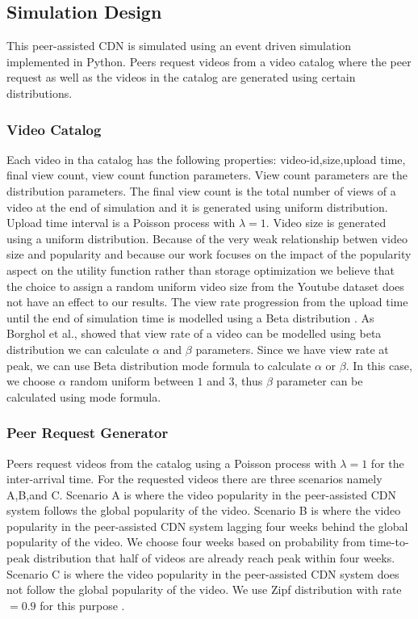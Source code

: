 \subsection{Simulation Design}\label{simulationdesign}
This peer-assisted CDN is simulated using an event driven simulation implemented in Python. 
Peers request videos from a video catalog where the peer request as well as the videos in the catalog are generated using certain distributions.

\subsubsection{Video Catalog}\label{catalog}
Each video in tha catalog has the following properties: 
video-id,size,upload time, final view count, view count function parameters. 
View count parameters are the distribution parameters.
The final view count is the total number of views of a video at the end of simulation and it is generated using uniform distribution.
Upload time interval is a Poisson process with $\lambda=1$.
Video size is generated using a uniform distribution.
Because of the very weak relationship betwen video size and popularity \cite{abhari2010workload} and because our work focuses on the impact of the popularity aspect on the utility function rather than storage optimization we believe that the choice to assign a random uniform video size from the Youtube dataset does not have an effect to our results. 
The view rate progression from the upload time until the end of simulation time is modelled using a Beta distribution \cite{Borghol:2011:CMP:2039452.2039717}.
As Borghol et al.,\cite{Borghol:2011:CMP:2039452.2039717} showed that view rate of a video can be modelled using beta distribution we can calculate $\alpha$ and $\beta$ parameters.
Since we have view rate at peak, we can use Beta distribution mode formula to calculate $\alpha$ or $\beta$. In this case, we choose $\alpha$ random uniform between $1$ and $3$, thus $\beta$ parameter can be calculated using mode formula.



\subsubsection{Peer Request Generator}\label{peerrequest}
Peers request videos from the catalog using a Poisson process with $\lambda=1$ \cite{Zink:2009:CYN:1502814.1502987} for the inter-arrival time.
For the requested videos there are three scenarios namely A,B,and C.
Scenario A is where the video popularity in the peer-assisted CDN system follows the global popularity of the video.
Scenario B is where the video popularity in the peer-assisted CDN system lagging four weeks behind the global popularity of the video. 
We choose four weeks based on probability from time-to-peak distribution that half of videos are already reach peak within four weeks.
Scenario C is where the video popularity in the peer-assisted CDN system does not follow the global popularity of the video. 
We use Zipf distribution with rate$=0.9$ for this purpose \cite{6654887}.


